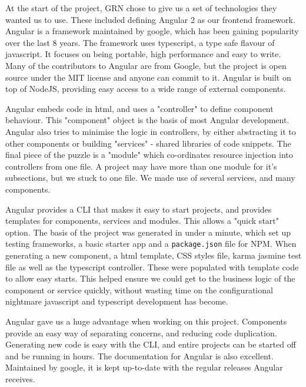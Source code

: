 \documentclass{l3proj}
\begin{document}
At the start of the project, GRN chose to give us a set of technologies they
 wanted us to use. These included defining Angular 2 as our frontend framework.
 Angular is a framework maintained by google, which has been gaining popularity
 over the last 8 years\cite{angularjsoverview}. The framework uses typescript,
 a type safe flavour of javascript. It focuses on being portable, high performance
 and easy to write\cite{angular_features}. Many of the contributors to Angular are
 from Google, but the project is open source under the MIT license and anyone can
 commit to it\cite{angularjsoverview}. Angular is built on top of NodeJS, providing
 easy access to a wide range of external components.

Angular embeds code in html, and uses a "controller" to define component behaviour. This
 "component" object is the basis of most Angular development. Angular also tries
 to minimise the logic in controllers, by either abstracting it to other components
 or building "services" - shared libraries of code snippets. The final piece of the puzzle
 is a "module" which co-ordinates resource injection into controllers from one
 file. A project may have more than one module for it's subsections, but we stuck to
 one file. We made use of several services, and many components.

Angular provides a CLI that makes it easy to start projects, and provides
 templates for components, services and modules. This allows a "quick start"
 option. The basis of the project was generated in under a minute, which set up
 testing frameworks, a basic starter app and a \texttt{package.json} file for NPM.
 When generating a new component, a html template, CSS styles file, karma
 jasmine test file as well as the typescript controller. These were populated
 with template code to allow easy starts. This helped ensure we could get to
 the business logic of the component or service quickly, without wasting time
 on the configurational nightmare javascript and typescript development has
 become.

 

Angular gave us a huge advantage when working on this project. Components provide
 an easy way of separating concerns, and reducing code duplication. Generating new
 code is easy with the CLI, and entire projects can be started off and be running
 in hours. The documentation for Angular is also excellent. Maintained by google,
 it is kept up-to-date with the regular releases Angular receives.
\end{document}
